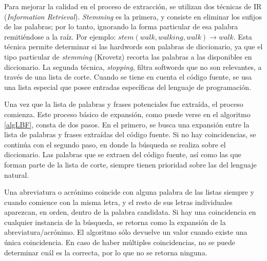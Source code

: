 Para mejorar la calidad en el proceso de extracción, se utilizan dos técnicas de IR (\textit{Information Retrieval}).
\textit{Stemming} es la primera, y consiste en eliminar los sufijos de las palabras; por lo tanto, ignorando la forma particular de esa palabra remitiéndose a la raíz.
Por ejemplo: $stem(walk, walking, walk) \rightarrow walk$.
Esta técnica permite determinar si las hardwords son palabras de diccionario, ya que el tipo particular de \textit{stemming} (Krovetz) recorta las palabras a las disponibles en diccionario.
La segunda técnica, \textit{stopping}, filtra softwords que no son relevantes, a través de una lista de corte.
Cuando se tiene en cuenta el código fuente, se usa una lista especial que posee entradas específicas del lenguaje de programación.

Una vez que la lista de palabras y frases potenciales fue extraída, el proceso comienza. 
Este proceso básico de expansión, como puede verse en el algoritmo \ref{algLBF}, consta de dos pasos.
En el primero, se busca una expansión entre la lista de palabras y frases extraídas del código fuente.
Si no hay coincidencias, se continúa con el segundo paso, en donde la búsqueda se realiza sobre el diccionario.
Las palabras que se extraen del código fuente, así como las que forman parte de la lista de corte, siempre tienen prioridad sobre las del lenguaje natural.

Una abreviatura o acrónimo coincide con alguna palabra de las listas siempre y cuando comience con la misma letra, y el resto de sus letras individuales aparezcan, en orden, dentro de la palabra candidata.
Si hay una coincidencia en cualquier instancia de la búsqueda, se retorna como la expansión de la abreviatura/acrónimo.
El algoritmo sólo devuelve un valor cuando existe una única coincidencia.
En caso de haber múltiples coincidencias, no se puede determinar cuál es la correcta, por lo que no se retorna ninguna.


